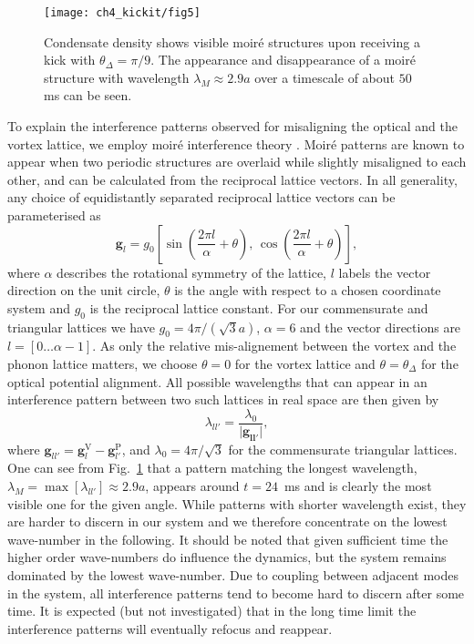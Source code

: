 	\begin{figure}[bt]
        \centering
		\texttt{[image: ch4\_kickit/fig5]}
		\caption[Oscillation of moir\'e wavelength.]{Condensate density shows visible moir\'e structures upon receiving a kick with $\theta_\Delta=\pi/9$. The appearance and disappearance of a moir\'e structure with wavelength $\lambda_M \approx 2.9 a$ over a timescale of about $50$ ms can be seen.}
		\label{fig:dtheta20_ev}
	\end{figure}

    To explain the interference patterns observed for misaligning the optical and the vortex lattice, we employ moir\'e interference theory \cite{SS:Hermann_jpcm_2012}. Moir\'e patterns are known to appear when two periodic structures are overlaid while slightly misaligned to each other, and can be calculated from the reciprocal lattice vectors. In all generality, any choice of equidistantly separated reciprocal lattice vectors can be parameterised as
    	\begin{equation}
    		\mathbf{g}_{l} = g_0 \left[ \sin\left( \frac{2\pi l}{\alpha}+\theta \right),\, \cos\left( \frac{2\pi l}{\alpha} +\theta\right) \right],
    	\end{equation}
    where $\alpha$ describes the rotational symmetry of the lattice, $l$ labels the vector direction on the unit circle, $\theta$ is the angle with respect to a chosen coordinate system and $g_0$ is the reciprocal lattice constant. For our commensurate and triangular lattices we have $g_0=4\pi/(\sqrt{3}a)$, $\alpha=6$ and the vector directions are $l=\left[0\dots\alpha-1\right]$. As only the relative mis-alignement between the vortex and the phonon lattice matters, we choose $\theta=0$ for the vortex lattice and $\theta=\theta_\Delta$ for the optical potential alignment.
    All possible wavelengths that can appear in an interference pattern between two such lattices in real space are then given by
    	\begin{equation}
    		\lambda_{ll'} = \frac{\lambda_0}{|\mathbf{\mathbf{g}_{ll'}|}},
    		\label{eq:InterferenceVectors}
    	\end{equation}
    where
    $\mathbf{g}_{ll'}=\mathbf{g}_{l}^{\text{V}}-\mathbf{g}_{l'}^{\text{P}}$, and
    $\lambda_0 = 4\pi/\sqrt{3}$ for the commensurate triangular lattices.
    One can see from Fig.~\ref{fig:dtheta20_ev} that a pattern matching the longest wavelength, $\lambda_M= \max[\lambda_{ll'}] \approx 2.9 a$, appears around $t=24$~ms and is clearly the most visible one for the given angle. While patterns with shorter wavelength exist, they are harder to discern in our system and we therefore concentrate on the lowest wave-number in the following. It should be noted that given sufficient time the higher order wave-numbers do influence the dynamics, but the system remains dominated by the lowest wave-number. Due to coupling between adjacent modes in the system, all interference patterns tend to become hard to discern after some time. It is expected (but not investigated) that in the long time limit the interference patterns will eventually refocus and reappear.


